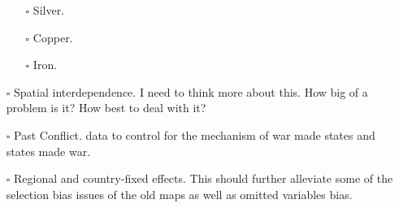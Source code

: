 \documentclass[12pt]{article}
\begin{document}
\begin{itemize}
\begin{itemize}
		\item[$\square$] Silver.
			
		\item[$\square$] Copper.

		\item[$\square$] Iron.
	\end{itemize}

	\item[$\square$] Spatial interdependence. I need to think more about
		this. How big of a problem is it? How best to deal with it?

	\item[$\square$] Past Conflict. \citet{Brecke1999} data to control for
		the \citet{Tilly1990} mechanism of war made states and states
		made war.

	\item[$\square$] Regional and country-fixed effects. This should further
		alleviate some of the selection bias issues of the old maps as
		well as omitted variables bias.
\end{itemize}
\end{document}
